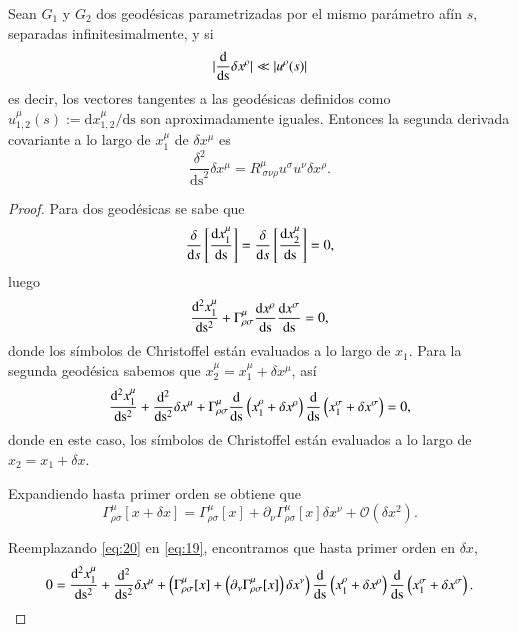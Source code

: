 \begin{theorem}
\label{teo:1}
Sean $G_1$ y $G_2$ dos geodésicas parametrizadas por el mismo parámetro afín $s$, separadas infinitesimalmente, y si 
$$|\dv{ }{ \mathrm{s} } \delta x^{\rho}| \ll |u^{\rho}(s)|$$
es decir, los vectores tangentes a las geodésicas definidos como $u^{\mu}_{1,2}(s) := \mathrm{d}x^{\mu}_{1,2}/\mathrm{ds}$ son aproximadamente iguales. Entonces la segunda derivada covariante a lo largo de $x^{\mu}_1$ de $\delta x^{\mu}$ es
\begin{equation}
\label{eq:17}
\frac{\delta^2}{\mathrm{ds}^2}\delta x^{\mu} = R^{\mu}_{\ \sigma \nu \rho} u^{\sigma} u^{\nu} \delta x^{\rho}.
\end{equation}
\end{theorem}
\begin{proof}
Para dos geodésicas se sabe que
\begin{equation}
\frac{\delta  }{\mathrm{d}s}\left[ \dv{x_1^{\mu}}{\mathrm{s}} \right] = \frac{\delta  }{\mathrm{d}s}\left[ \dv{x_2^{\mu}}{\mathrm{s}} \right] = 0,
\end{equation}
luego
\begin{equation}
\label{eq:18}
\dv[2]{x_1^{\mu}}{\mathrm{s}} + \Gamma^{\mu}_{\rho \sigma} \dv{x^{\rho}}{\mathrm{s}} \dv{x^{\sigma}}{\mathrm{s}} = 0,
\end{equation}
donde los símbolos de Christoffel están evaluados a lo largo de $x_1$. Para la segunda geodésica sabemos que $x_2^{\mu} = x_1^{\mu} + \delta x^{\mu}$, así
\begin{equation}
\label{eq:19}
\dv[2]{x_1^{\mu}}{\mathrm{s}} + \dv[2]{ }{\mathrm{s}} \delta x^{\mu} + \Gamma^{\mu}_{\rho \sigma} \dv{ }{\mathrm{s}} \left( x_1^{\rho} + \delta x^{\rho} \right) \dv{ }{\mathrm{s}} \left( x_1^{\sigma} + \delta x^{\sigma} \right) = 0,
\end{equation}
donde en este caso, los símbolos de Christoffel están evaluados a lo largo de $x_2=x_1 + \delta x$. 

Expandiendo hasta primer orden se obtiene que
\begin{equation}
\label{eq:20}
\Gamma^{\mu}_{\rho \sigma}[x + \delta x] = \Gamma^{\mu}_{\rho \sigma}[x] + \partial_{\nu} \Gamma^{\mu}_{\rho \sigma}[x] \delta x^{\nu} + \mathcal{O}(\delta x^2).
\end{equation}

Reemplazando \eqref{eq:20} en \eqref{eq:19}, encontramos que hasta primer orden en $\delta x$,
\begin{equation}
0 = \dv[2]{x_1^{\mu}}{\mathrm{s}} + \dv[2]{ }{\mathrm{s}} \delta x^{\mu} + \left( \Gamma^{\mu}_{\rho \sigma}[x] + \left( \partial_{\nu} \Gamma^{\mu}_{\rho \sigma}[x] \right) \delta x^{\nu} \right) \dv{ }{\mathrm{s}} \left( x_1^{\rho} + \delta x^{\rho} \right) \dv{ }{\mathrm{s}} \left( x_1^{\sigma} + \delta x^{\sigma} \right).
\end{equation}


\end{proof}
